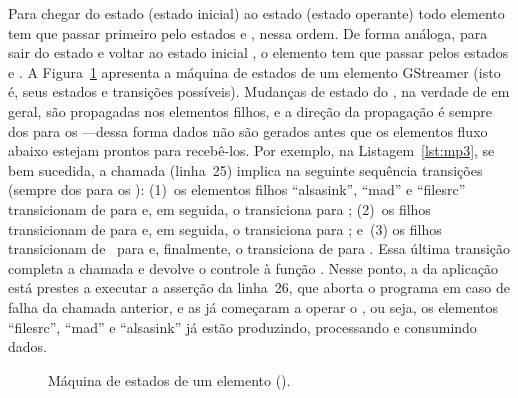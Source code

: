 \documentclass{SBCbookchapter}
\begin{document}
Para chegar do estado  (estado inicial) ao estado 
(estado operante) todo elemento tem que passar primeiro pelo estados
 e , nessa ordem.  De forma análoga, para sair do
estado  e voltar ao estado inicial , o elemento tem que
passar pelos estados  e .
A Figura~\ref{fig:estados-elt} apresenta a máquina de estados de um elemento
GStreamer (isto é, seus estados e transições possíveis).  Mudanças de estado
do , na verdade de  em geral, são propagadas nos
elementos filhos, e a direção da propagação é sempre dos  para os
---dessa forma dados não são gerados antes que os elementos
fluxo abaixo estejam prontos para recebê-los.  Por exemplo, na
Listagem~\ref{lst:mp3}, se bem sucedida, a chamada 
(linha~25) implica na seguinte sequência transições (sempre dos 
para os ): (1)~os elementos filhos ``alsasink'', ``mad'' e
``filesrc'' transicionam de  para  e, em seguida, o
 transiciona para ; (2)~os filhos transicionam de
 para  e, em seguida, o  transiciona para
; e~(3) os filhos transicionam de~ para 
e, finalmente, o  transiciona de  para .
Essa última transição completa a chamada e devolve o controle à função
.  Nesse ponto, a  da aplicação está prestes a executar a
asserção da linha~26, que aborta o programa em caso de falha da chamada
anterior, e as  já começaram a operar o ,
ou seja, os elementos ``filesrc'', ``mad'' e ``alsasink'' já estão
produzindo, processando e consumindo dados.

\begin{figure}[b]
  \centering
  \caption{Máquina de estados de um elemento ().}
  \label{fig:estados-elt}
\end{figure}
\end{document}
